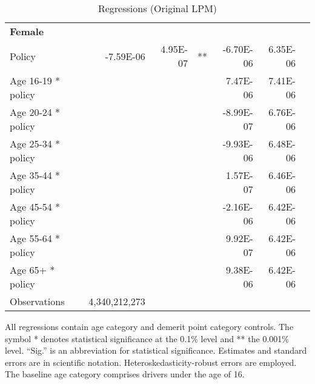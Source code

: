 \begin{table}
\begin{tabular}{l r r l r r l}
\hline 

\textbf{Female} \\ 

Policy             &  -7.59E-06        &  4.95E-07       &   **       &  -6.70E-06        &  6.35E-06       &            \\ 
Age 16-19 * policy           & & &  &  7.47E-06        &  7.41E-06       &            \\ 
Age 20-24 * policy           & & &  &  -8.99E-07        &  6.76E-06       &            \\ 
Age 25-34 * policy           & & &  &  -9.93E-06        &  6.48E-06       &            \\ 
Age 35-44 * policy           & & &  &  1.57E-07        &  6.46E-06       &            \\ 
Age 45-54 * policy           & & &  &  -2.16E-06        &  6.42E-06       &            \\ 
Age 55-64 * policy           & & &  &  9.92E-07        &  6.42E-06       &            \\ 
Age 65+ * policy           & & &  &  9.38E-06        &  6.42E-06       &            \\ 
Observations & 4,340,212,273 \\ 


\hline 

\end{tabular} 
\caption{Regressions (Original LPM)} 
All regressions contain age category and demerit point category controls. 
The symbol * denotes statistical significance at the 0.1\% level 
and ** the 0.001\% level. 
``Sig.'' is an abbreviation for statistical significance. 
Estimates and standard errors are in scientific notation. 
Heteroskedasticity-robust errors are employed. 
The baseline age category comprises drivers under the age of 16. 
\label{tab:orig_regs} 
\end{table} 
 
